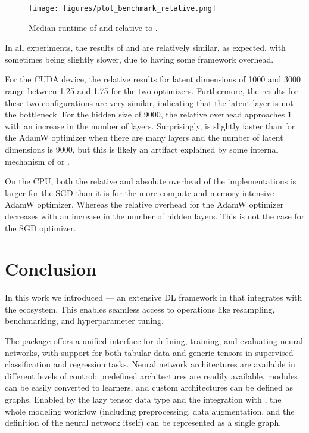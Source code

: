 \documentclass[article]{jss}
\theoremstyle{definition}
\begin{document}
\begin{figure}[h]
    \centering
    \texttt{[image: figures/plot\_benchmark\_relative.png]}
    \caption{Median runtime of \mlrttorch{}  and \torch{} relative to \pytorch{}.}
    \label{fig:optimizer-benchmark-relative}
\end{figure}



In all experiments, the results of \torch{} and \mlrttorch{} are relatively similar, as expected, with \mlrttorch{} sometimes being slightly slower, due to having some framework overhead.

For the CUDA device, the relative results for latent dimensions of 1000 and 3000 range between 1.25 and 1.75 for the two optimizers.
Furthermore, the results for these two configurations are very similar, indicating that the latent layer is not the bottleneck.
For the hidden size of 9000, the relative overhead approaches 1  with an increase in the number of layers. 
Surprisingly, \mlrttorch{} is slightly faster than \torch{} for the AdamW optimizer when there are many layers and the number of latent dimensions is 9000, but this is likely an artifact explained by some internal mechanism of \torch{} or \libtorch{}.

On the CPU, both the relative and absolute overhead of the \rlang{} implementations is larger for the SGD than it is for the more compute and memory intensive AdamW optimizer.
Whereas the relative overhead for the AdamW optimizer decreases with an increase in the number of hidden layers. This is not the case for the SGD optimizer.

\section{Conclusion}\label{sec:conclusion}

In this work we introduced  --- an extensive DL framework in \rlang{} that integrates with the \mlrt{} ecosystem.
This enables seamless access to operations like resampling, benchmarking, and hyperparameter tuning.

The package offers a unified interface for defining, training, and evaluating neural networks, with support for both tabular data and generic tensors in supervised classification and regression tasks.
Neural network architectures are available in different levels of control: predefined architectures are readily available, \torch{} modules can be easily converted to \mlrttorch{} learners, and custom architectures can be defined as graphs.
Enabled by the lazy tensor data type and the integration with \mlrtpipelines{}, the whole modeling workflow (including preprocessing, data augmentation, and the definition of the neural network itself) can be represented as a single graph.
\end{document}
